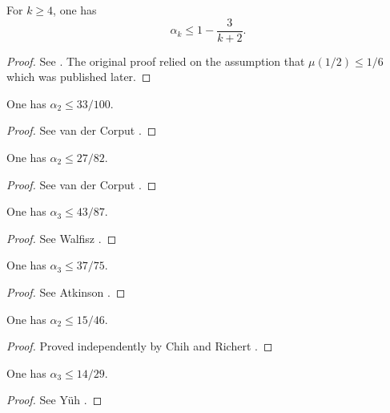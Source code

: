 \begin{lemma}
For $k \ge 4$, one has
\[
\alpha_k \leq 1 - \frac{3}{k + 2}.
\]
\end{lemma}
\begin{proof}
See \cite{hardy_littlewood_approximate_1923}. The original proof relied on the assumption that $\mu(1/2) \le 1/6$ which was published later.
\end{proof}

\begin{lemma}
One has $\alpha_2 \le 33/100$.
\end{lemma}
\begin{proof}
See van der Corput \cite{van_der_corput_verscharfung_1922}.
\end{proof}


\begin{lemma}
One has $\alpha_2 \le 27/82$.
\end{lemma}
\begin{proof}
See van der Corput \cite{van_der_corput_zum_1928}.
\end{proof}

\begin{lemma}
One has $\alpha_3 \le 43/87$.
\end{lemma}
\begin{proof}
See Walfisz \cite{walfisz_uber_1926}.
\end{proof}

\begin{lemma}
One has $\alpha_3 \le 37/75$.
\end{lemma}
\begin{proof}
See Atkinson \cite{atkinson_divisor_1941}.
\end{proof}


\begin{lemma}
One has $\alpha_2 \le 15/46$.
\end{lemma}
\begin{proof}
Proved independently by Chih \cite{chih_on_1950} and Richert \cite{richert_verschrfung_1953}.
\end{proof}

\begin{lemma}
One has $\alpha_3 \le 14/29$.
\end{lemma}
\begin{proof}
See Y\"{u}h \cite{yuh_divisor_1958}.
\end{proof}


